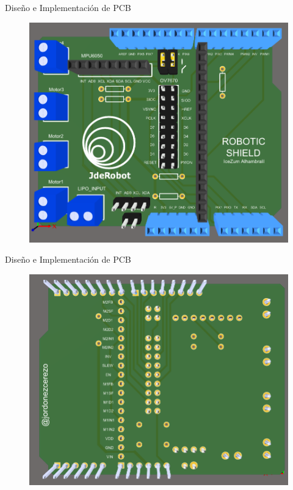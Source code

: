 \documentclass{beamer}
\begin{document}
\begin{frame}{Diseño e Implementación de PCB}
	\begin{figure}[H]
		\center
		\includegraphics[scale=0.45]{imagenes/Balancing_Robot/top_3D.PNG}
	\end{figure}
\end{frame}

\begin{frame}{Diseño e Implementación de PCB}
		\begin{figure}[H]
	\center
	\includegraphics[scale=0.45]{imagenes/Balancing_Robot/bottom_3D.PNG}
\end{figure}
\end{frame}
\end{document}
